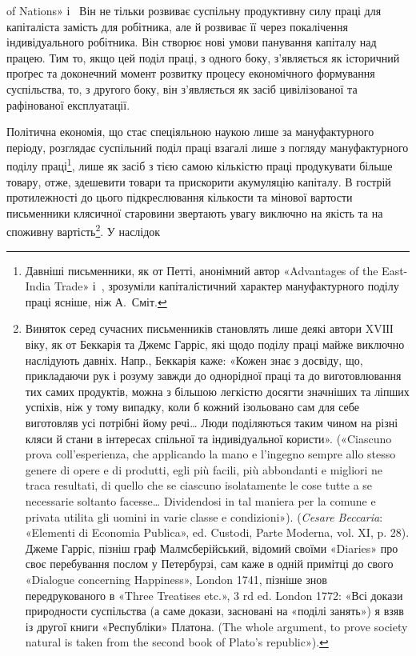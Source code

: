 \parcont{}  %
of Nations» і~ Він не тільки розвиває суспільну продуктивну
силу праці для капіталіста замість для робітника, але й розвиває
її через покалічення індивідуального робітника. Він створює
нові умови панування капіталу над працею. Тим то, якщо цей
поділ праці, з одного боку, з’являється як історичний проґрес
та доконечний момент розвитку процесу економічного формування
суспільства, то, з другого боку, він з’являється як засіб
цивілізованої та рафінованої експлуатації.

Політична економія, що стає спеціяльною наукою лише за
мануфактурного періоду, розглядає суспільний поділ праці взагалі
лише з погляду мануфактурного поділу праці\footnote{
Давніші письменники, як от Петті, анонімний автор «Advantages
of the East-India Trade» і~, зрозуміли капіталістичний характер
мануфактурного поділу праці ясніше, ніж А.~Сміт.
}, лише як
засіб з тією самою кількістю праці продукувати більше товару,
отже, здешевити товари та прискорити акумуляцію капіталу.
В гострій протилежності до цього підкреслювання кількости та
мінової вартости письменники клясичної старовини звертають
увагу виключно на якість та на споживну вартість\footnote{
Виняток серед сучасних письменників становлять лише деякі
автори XVІІІ віку, як от Беккарія та Джемс Гарріс, які щодо поділу
праці майже виключно наслідують давніх. Напр., Беккарія каже: «Кожен
знає з досвіду, що, прикладаючи рук і розуму завжди до однорідної праці
та до виготовлювання тих самих продуктів, можна з більшою легкістю
досягти значніших та ліпших успіхів, ніж у тому випадку, коли б кожний
ізольовано сам для себе виготовляв усі потрібні йому речі\dots{} Люди поділяються
таким чином на різні кляси й стани в інтересах спільної та індивідуальної
користи». («Ciascuno prova coll’esperienza, che applicando
la mano e l’ingegno sempre allo stesso genere di opere e di produtti, egli
più facili, più abbondanti e migliori ne traca resultati, di quello che se
ciascuno isolatamente le cose tutte a se necessarie soltanto facesse\dots{} Dividendosi
in tal maniera per la comune e privata utilita gli uomini
in varie classe e condizioni»). (\emph{Cesare Beccaria}: «Elementi di Economia
Publica», ed. Custodi, Parte Moderna, vol. XI, p. 28). Джеме
Гарріс, пізніш граф Малмсберійський, відомий своїми «Diaries» про
своє перебування послом у Петербурзі, сам каже в одній примітці до
свого «Dialogue concerning Happiness», London 1741, пізніше знов передрукованого
в «Three Treatises etc.», 3 rd ed. London 1772: «Всі докази
природности суспільства (а саме докази, засновані на «поділі занять»)
я взяв із другої книги «Республіки» Платона. (The whole argument,
to prove society natural is taken from the second book of Plato’s
republic»).
}. У наслідок
